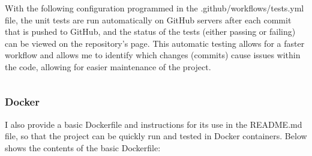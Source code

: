 \documentclass[./project-report/src/latex/project-report.tex]{subfiles}
\begin{document}
With the following configuration programmed in the .github/workflows/tests.yml file, the unit tests are run automatically on GitHub servers after each commit that is pushed to GitHub, 
and the status of the tests (either passing or failing) can be viewed on the repository's page. This automatic testing allows for a faster workflow and allows me to identify which changes 
(commits) cause issues within the code, allowing for easier maintenance of the project.

\inputminted{yaml}{./.github/workflows/tests.yml}

\subsubsection{Docker}

I also provide a basic Dockerfile and instructions for its use in the README.md file, so that the project can be quickly run and tested in Docker containers. Below 
shows the contents of the basic Dockerfile:

\inputminted{docker}{./Dockerfile}
\end{document}
